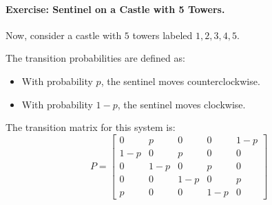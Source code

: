 \paragraph{Exercise: Sentinel on a Castle with 5 Towers.}
Now, consider a castle with \( 5 \) towers labeled \( 1, 2, 3, 4, 5 \). 
\begin{center}
\end{center}
The transition probabilities are defined as:
\begin{itemize}
    \item With probability \( p \), the sentinel moves counterclockwise.
    \item With probability \( 1-p \), the sentinel moves clockwise.
\end{itemize}
The transition matrix for this system is:
\[
P =
\begin{bmatrix}
0 & p & 0 & 0 & 1-p \\
1-p & 0 & p & 0 & 0 \\
0 & 1-p & 0 & p & 0 \\
0 & 0 & 1-p & 0 & p \\
p & 0 & 0 & 1-p & 0
\end{bmatrix}
\]


